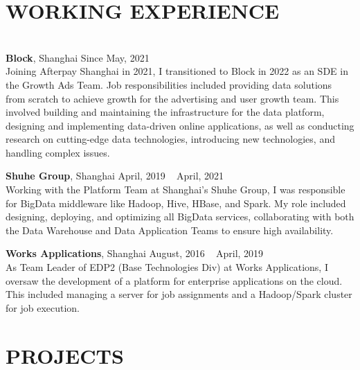 \documentclass{res}
\begin{document}
\thispagestyle{empty} %

\address{{\bf Address:} 466 Tianbao Road, Shanghai, 200086 \hspace{0.25in}  {\bf Tel:} 18017661124 \hspace{0.25in}  {\bf   Email:} dd.famous@gmail.com}

\begin{resume}
\section{{WORKING EXPERIENCE}}
\vspace{-10pt}
\hrulefill\\

\vspace{-15pt}
{\bf Block}, Shanghai \hfill Since May, 2021 \\
Joining Afterpay Shanghai in 2021, I transitioned to Block in 2022 as an SDE in the Growth Ads Team. Job responsibilities included providing data solutions from scratch to achieve growth for the advertising and user growth team. This involved building and maintaining the infrastructure for the data platform, designing and implementing data-driven online applications, as well as conducting research on cutting-edge data technologies, introducing new technologies, and handling complex issues.

\vspace{-5pt}
{\bf Shuhe Group}, Shanghai \hfill April, 2019 ~ April, 2021 \\
Working with the Platform Team at Shanghai's Shuhe Group, I was responsible for BigData middleware like Hadoop, Hive, HBase, and Spark. My role included designing, deploying, and optimizing all BigData services, collaborating with both the Data Warehouse and Data Application Teams to ensure high availability.

\vspace{-5pt}
{\bf Works Applications}, Shanghai \hfill August, 2016 ~ April, 2019\\
As Team Leader of EDP2 (Base Technologies Div) at Works Applications, I oversaw the development of a platform for enterprise applications on the cloud. This included managing a server for job assignments and a Hadoop/Spark cluster for job execution. 

\section{{PROJECTS}}
\vspace{-10pt}
\hrulefill\\


\end{resume}
\end{document}
